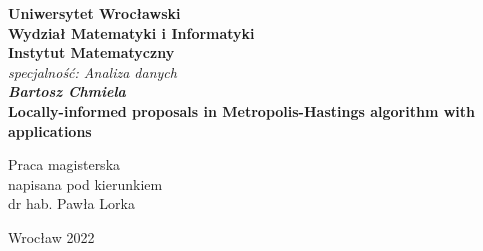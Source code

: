\documentclass[a4paper, 12pt]{article}
\numberwithin{equation}{subsection}
\begin{document}
	\thispagestyle{empty}
	\begin{center}
		\textbf{\large Uniwersytet Wroc\l{}awski\\
			Wydzia\l{} Matematyki i Informatyki\\
			Instytut Matematyczny}\\
		\textit{\large specjalno\'{s}\'{c}: Analiza danych}\\
		\vspace{4cm}
		\textbf{\textit{\large Bartosz Chmiela}\\
			\vspace{0.5cm}
			{\Large Locally-informed proposals in Metropolis-Hastings algorithm with applications}}\\
	\end{center}
	\vspace{3cm}
	{\large \hspace*{6.5cm}Praca magisterska\\
		\hspace*{6.5cm}napisana pod kierunkiem\\
		\hspace*{6.5cm}dr hab. Paw\l{}a Lorka }\\
	\vfill
	\begin{center}
		{\large Wroc\l{}aw 2022}\\
	\end{center}
	
	\newpage
	\vspace*{\fill}
	\begin{abstract}
		The Markov Chain Monte Carlo methods (abbrv. MCMC) are a family of algorithms used for sampling from a given probability distribution. They prove very effective when the state space is large. This fact can be used to solve many hard deterministic problems -- one of them being \textit{traveling salesmen problem}. It will be used in this thesis to test a new approach of \textit{locally-informed propolsals} as a modification of well known \textit{Metropolis-Hastings} algorithm. In this thesis we will present the implementation of modified algorithm, experiments based on it, results and a comparison of to previous MCMC methods.
		
		\rule{0.8\textwidth}{0.4pt}
		
		Metody próbkowania Monte Carlo łańcuchami Markowa są rodziną algorytmow używanych do próbkowania z danego rozkładu prawdopodobieństwa. Okazują się efektywne zwłaszcza gdy przestrzeń stańw jest wielka. Ten fakt może być wykorzystany przy rozwiązywaniu wielu deterministycznych problemów -- jednym z nich jest \textit{problem komiwojażera}. Zostanie on użyty w tej pracy do przetestowania nowego podejścia \textit{lokalnie poinformowawnego?}, jako modyfikacji dobrze znanego algorytmu \textit{Metropolisa-Hastinigsa}. W tej pracy zaprezentujemy implementacje zmodyfikowanego algorytmu, eksperymentów bezujących na nim, wyników oraz porównania z poprzednimi metodami próbkowania Monte Carlo.
	\end{abstract}
	\vspace*{\fill}
	\clearpage
	
\end{document}

